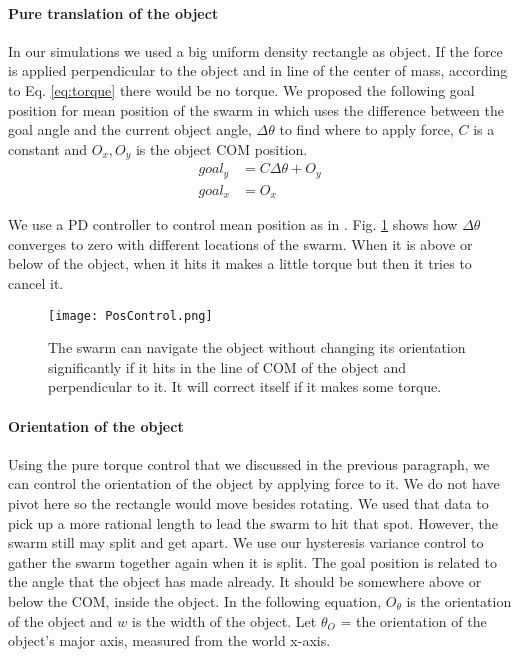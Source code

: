 \paragraph{Pure translation of the object} \label{para:PureTranslation}
In our simulations we used a big uniform density rectangle as object. If the force is applied perpendicular to the object and in line of the center of mass, according to Eq. \ref{eq:torque} there would be no torque. We proposed the following goal position for mean position of the swarm in which uses the difference between the goal angle and the current object angle, $\Delta \theta$ to find where to apply force, $C$ is a constant and $O_x,O_y$ is the object COM position.
\begin{align}\nonumber
goal_y &= C \Delta \theta + O_y\\
goal_x &= O_x
\end{align}

We use a PD controller to control mean position as in \cite{ShahrokhiIROS2015}. Fig. \ref{fig:PosControlFig} shows how $\Delta \theta$ converges to zero with different locations of the swarm. When it is above or below of the object, when it hits it makes a little torque but then it tries to cancel it.
\begin{figure}
\begin{center}
	\texttt{[image: PosControl.png]}
\end{center}
\vspace{-1em}
\caption{\label{fig:PosControlFig}
The swarm can navigate the object without changing its orientation significantly if it hits in the line of COM of the object and perpendicular to it. It will correct itself if it makes some torque.
}
\vspace{-1em}
\end{figure}

\paragraph{Orientation of the object}
Using the pure torque control that we discussed in the previous paragraph, we can control the orientation of the object by applying force to it. We do not have pivot here so the rectangle would move besides rotating. We used that data to pick up a more rational length to lead the swarm to hit that spot. However, the swarm still may split and get apart. We use our hysteresis variance control to gather the swarm together again when it is split. The goal position is related to the angle that the object has made already. It should be somewhere above or below the COM, inside the object. In the following equation, $O_{\theta}$ is the orientation of the object and $w$ is the width of the object. Let $\theta_O$ = the orientation of the object's major axis, measured from the world x-axis.

